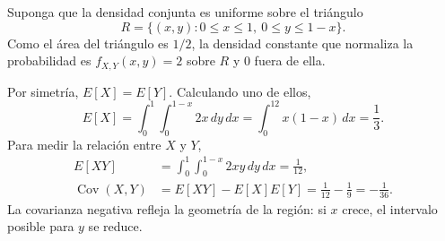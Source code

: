 Suponga que la densidad conjunta es uniforme sobre el triángulo
\[
R=\{(x,y):0\leq x\leq1,\ 0\leq y\leq1-x\}.
\]
Como el área del triángulo es $1/2$, la densidad constante que normaliza la probabilidad es $f_{X,Y}(x,y)=2$ sobre $R$ y $0$ fuera de ella.

\begin{center}
\end{center}

Por simetría, $E[X]=E[Y]$. Calculando uno de ellos,
\[
E[X]=\int_0^1\int_0^{1-x}2x\,dy\,dx
=\int_0^12x(1-x)\,dx=\frac13.
\]
Para medir la relación entre $X$ y $Y$,
\begin{align*}
E[XY]&=\int_0^1\int_0^{1-x}2xy\,dy\,dx=\frac1{12},\\
\operatorname{Cov}(X,Y)&=E[XY]-E[X]E[Y]
=\frac1{12}-\frac19=-\frac1{36}.
\end{align*}
La covarianza negativa refleja la geometría de la región: si $x$ crece, el intervalo posible para $y$ se reduce.

